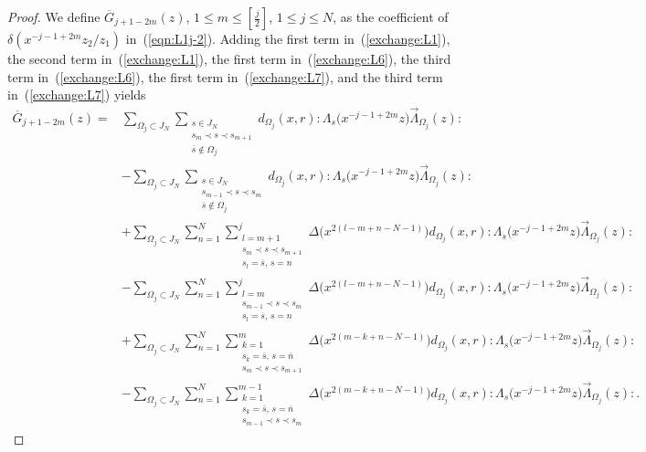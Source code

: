 \documentclass[pdftex]{sigma}
\numberwithin{equation}{section}
\begin{document}
\begin{proof}
We define $\overline{G}_{j+1-2m}(z)$, $1\leq m \leq [\frac{j}{2}]$, $1\leq j \leq N$,
as the coefficient of $\delta(x^{-j-1+2m}z_2/z_1)$ in~(\ref{eqn:L1j-2}).
Adding the first term in~(\ref{exchange:L1}), the second term in~(\ref{exchange:L1}),
the first term in~(\ref{exchange:L6}), the third term in~(\ref{exchange:L6}),
the first term in~(\ref{exchange:L7}),
and the third term in~(\ref{exchange:L7}) yields
\begin{align*}
\overline{G}_{j+1-2m}(z)={}&\sum_{\Omega_j \subset J_N}
\sum_{\substack{s\in J_N\\s_m \prec s \prec s_{m+1}
\\ \overline{s} \notin \Omega_j}}d_{\Omega_j}(x,r)
{:}\Lambda_s\big(x^{-j-1+2m}z\big)\overrightarrow{\Lambda}_{\Omega_j}(z){:}
\\
&-\sum_{\Omega_j \subset J_N}\sum_{\substack{s\in J_N
\\s_{m-1} \prec s \prec s_{m}\\ \overline{s} \notin \Omega_j}}d_{\Omega_j}(x,r)
{:}\Lambda_s\big(x^{-j-1+2m}z\big)\overrightarrow{\Lambda}_{\Omega_j}(z){:}
\\
&+\sum_{\Omega_j \subset J_N}\sum_{n=1}^N\sum_{\substack{l=m+1
\\s_m \prec s \prec s_{m+1}\\s_l=\overline{s},\, s=n}}^j\!\!\!
\Delta\big(x^{2(l-m+n-N-1)}\big) d_{\Omega_j}(x,r)
{:}\Lambda_s\big(x^{-j-1+2m}z\big)\overrightarrow{\Lambda}_{\Omega_j}(z){:}
\\
&-\sum_{\Omega_j \subset J_N}\sum_{n=1}^N\sum_{\substack{l=m
\\s_{m-1} \prec s \prec s_{m}\\s_l=\overline{s},\, s=n}}^j\!\!\!
\Delta\big(x^{2(l-m+n-N-1)}\big) d_{\Omega_j}(x,r)
{:}\Lambda_s\big(x^{-j-1+2m}z\big)\overrightarrow{\Lambda}_{\Omega_j}(z){:}
\\
&+\sum_{\Omega_j \subset J_N}\sum_{n=1}^N\sum_{\substack{k=1
\\s_k=\overline{s},\, s=\overline{n}\\s_m \prec s \prec s_{m+1}}}^m\!\!\!
\Delta\big(x^{2(m-k+n-N-1)}\big) d_{\Omega_j}(x,r)
{:}\Lambda_s\big(x^{-j-1+2m}z\big)\overrightarrow{\Lambda}_{\Omega_j}(z){:}
\\
&-\sum_{\Omega_j \subset J_N}\sum_{n=1}^N\!\sum_{\substack{k=1
\\s_k=\overline{s},\, s=\overline{n}
\\s_{m-1} \prec s \prec s_{m}}}^{m-1}\!\!\!
\Delta\big(x^{2(m-k+n-N-1)}\big) d_{\Omega_j}(x,r)
{:}\Lambda_s\big(x^{-j-1+2m}z\big)\overrightarrow{\Lambda}_{\Omega_j}(z){:}.

\end{align*}
\end{proof}
\end{document}
